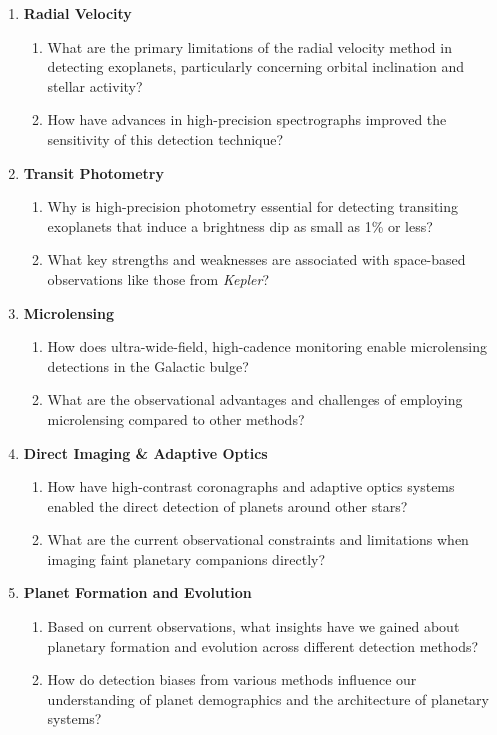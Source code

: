 \documentclass[floatfix, aps]{revtex4-2}
\begin{document}
\begin{enumerate}[label=\arabic*.]
	
	\item \textbf{Radial Velocity}
	\begin{enumerate}[label*=\arabic*.]
		\item What are the primary limitations of the radial velocity method in detecting exoplanets, particularly concerning orbital inclination and stellar activity?
		\item How have advances in high-precision spectrographs improved the sensitivity of this detection technique?
	\end{enumerate}
	
	\item \textbf{Transit Photometry}
	\begin{enumerate}[label*=\arabic*.]
		\item Why is high-precision photometry essential for detecting transiting exoplanets that induce a brightness dip as small as 1\% or less?
		\item What key strengths and weaknesses are associated with space-based observations like those from \textit{Kepler}?
	\end{enumerate}
	
	\item \textbf{Microlensing}
	\begin{enumerate}[label*=\arabic*.]
		\item How does ultra-wide-field, high-cadence monitoring enable microlensing detections in the Galactic bulge?
		\item What are the observational advantages and challenges of employing microlensing compared to other methods?
	\end{enumerate}
	
	\item \textbf{Direct Imaging \& Adaptive Optics}
	\begin{enumerate}[label*=\arabic*.]
		\item How have high-contrast coronagraphs and adaptive optics systems enabled the direct detection of planets around other stars?
		\item What are the current observational constraints and limitations when imaging faint planetary companions directly?
	\end{enumerate}
	
	\item \textbf{Planet Formation and Evolution}
	\begin{enumerate}[label*=\arabic*.]
		\item Based on current observations, what insights have we gained about planetary formation and evolution across different detection methods?
		\item How do detection biases from various methods influence our understanding of planet demographics and the architecture of planetary systems?
	\end{enumerate}
	

\end{enumerate}
\end{document}
